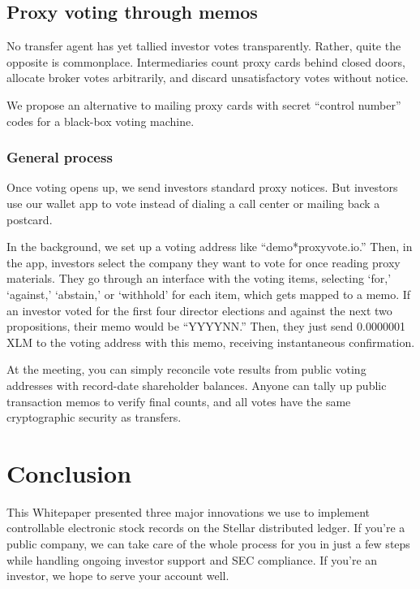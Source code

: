 \documentclass[11pt, english]{article}
\begin{document}
\begin{multicols}{2}
\subsection{Proxy voting through memos}

No transfer agent has yet tallied investor votes transparently. Rather, quite the opposite is commonplace. Intermediaries count proxy cards behind closed doors, allocate broker votes arbitrarily, and discard unsatisfactory votes without notice. \cite{proxy1,proxy2}

We propose an alternative to mailing proxy cards with secret ``control number'' codes for a black-box voting machine.

\subsubsection{General process}

Once voting opens up, we send investors standard proxy notices. But investors use our wallet app to vote instead of dialing a call center or mailing back a postcard.

In the background, we set up a voting address like ``demo*proxyvote.io.'' Then, in the app, investors select the company they want to vote for once reading proxy materials. They go through an interface with the voting items, selecting `for,' `against,' `abstain,' or `withhold' for each item, which gets mapped to a memo. If an investor voted for the first four director elections and against the next two propositions, their memo would be ``YYYYNN.'' Then, they just send 0.0000001 XLM to the voting address with this memo, receiving instantaneous confirmation.

At the meeting, you can simply reconcile vote results from public voting addresses with record-date shareholder balances. Anyone can tally up public transaction memos to verify final counts, and all votes have the same cryptographic security as transfers.

\section{Conclusion}

This Whitepaper presented three major innovations we use to implement controllable electronic stock records on the Stellar distributed ledger. If you're a public company, we can take care of the whole process for you in just a few steps while handling ongoing investor support and SEC compliance. If you're an investor, we hope to serve your account well.


\end{multicols}
\end{document}
